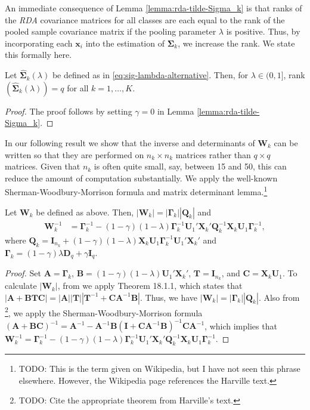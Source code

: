 \documentclass[11pt]{article}
\begin{document}
An immediate consequence of Lemma \ref{lemma:rda-tilde-Sigma_k} is that ranks of the \emph{RDA} covariance matrices for all classes are each equal to the rank of the pooled sample covariance matrix if the pooling parameter $\lambda$ is positive. Thus, by incorporating each $\bm x_i$ into the estimation of $\bm \Sigma_k$, we increase the rank. We state this formally here.

\begin{cor}
Let $\widehat{\bm \Sigma}_k(\lambda)$ be defined as in \eqref{eq:sig-lambda-alternative}. Then, for $\lambda \in (0, 1]$, rank$(\widehat{\bm \Sigma}_k(\lambda)) = q$ for all $k = 1, \ldots, K$.
\end{cor}
\begin{proof}
The proof follows by setting $\gamma = 0$ in Lemma \ref{lemma:rda-tilde-Sigma_k}.
\end{proof}



In our following result we show that the inverse and determinants of $\bm W_k$ can be written so that they are performed on $n_k \times n_k$ matrices rather than $q \times q$ matrices. Given that $n_k$ is often quite small, say, between 15 and 50, this can reduce the amount of computation substantially. We apply the well-known Sherman-Woodbury-Morrison formula and matrix determinant lemma.\footnote{TODO: This is the term given on Wikipedia, but I have not seen this phrase elsewhere. However, the Wikipedia page references the Harville text.}


\begin{lemma}\label{lemma:rda-W_k}
Let $\bm W_k$ be defined as above. Then, $|\bm W_k| = |\bm \Gamma_k| |\bm Q_k|$ and
	\begin{align}
		\bm W_k^{-1} &= \bm \Gamma_k^{-1} - (1 - \gamma)(1 - \lambda) \bm \Gamma_k^{-1} \bm U_1' \bm X_k' \bm Q_k^{-1} \bm X_k \bm U_1 \bm \Gamma_k^{-1},
	\end{align}
where $\bm Q_k = \bm I_{n_k} + (1 - \gamma)(1- \lambda) \bm X_k \bm U_1 \bm \Gamma_k^{-1} \bm U_1' \bm X_k'$ and $\bm \Gamma_k = (1 - \gamma) \lambda \bm D_q + \gamma \bm I_q$.
\end{lemma}
\begin{proof}
	Set $\bm A = \bm \Gamma_k$, $\bm B = (1 - \gamma)(1 - \lambda) \bm U_1' \bm X_k'$, $\bm T = \bm I_{n_k}$, and $\bm C = \bm X_k \bm U_1$. To calculate $|\bm W_k|$, from \cite{Harville:2008wja} we apply Theorem 18.1.1, which states that $|\bm A + \bm B \bm T \bm C| = |\bm A| |\bm T| |\bm T^{-1} + \bm C \bm A^{-1} \bm B|$. Thus, we have $|\bm W_k| = |\bm \Gamma_k| |\bm Q_k|$. Also from \cite{Harville:2008wja}\footnote{TODO: Cite the appropriate theorem from Harville's text.}, we apply the Sherman-Woodbury-Morrison formula $(\bm A + \bm B \bm C)^{-1} = \bm A^{-1} - \bm A^{-1} \bm B(\bm I + \bm C \bm A^{-1} \bm B)^{-1} \bm C \bm A^{-1}$, which implies that $\bm W_k^{-1} = \bm \Gamma_k^{-1} - (1 - \gamma)(1 - \lambda) \bm \Gamma_k^{-1} \bm U_1' \bm X_k' \bm Q_k^{-1} \bm X_k \bm U_1 \bm \Gamma_k^{-1}$.
\end{proof}
\end{document}
